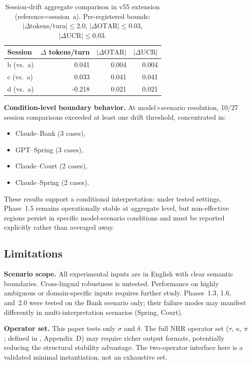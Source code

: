 \documentclass[11pt,a4paper]{article}
\begin{document}
\begin{table}[ht]
\centering
\begin{tabular}{lrrr}
\toprule
\textbf{Session} & $\Delta$ tokens/turn & $|\Delta\text{OTAR}|$ & $|\Delta\text{UCR}|$ \\
\midrule
b (vs.\ a) & 0.041 & 0.004 & 0.004 \\
c (vs.\ a) & 0.033 & 0.041 & 0.041 \\
d (vs.\ a) & -0.218 & 0.021 & 0.021 \\
\bottomrule
\end{tabular}
\caption{Session-drift aggregate comparison in v55 extension (reference=session~a).
Pre-registered bounds: $|\Delta\text{tokens/turn}| \le 2.0$, $|\Delta\text{OTAR}| \le 0.03$, $|\Delta\text{UCR}| \le 0.03$.}
\label{tab:v55_session_drift}
\end{table}

\textbf{Condition-level boundary behavior.}
At model$\times$scenario resolution, 10/27 session comparisons exceeded at least
one drift threshold, concentrated in:
\begin{itemize}
    \item Claude--Bank (3 cases),
    \item GPT--Spring (3 cases),
    \item Claude--Court (2 cases),
    \item Claude--Spring (2 cases).
\end{itemize}

These results support a conditional interpretation: under tested settings,
Phase~1.5 remains operationally stable at aggregate level, but non-effective
regions persist in specific model-scenario conditions and must be reported
explicitly rather than averaged away.

\subsection{Limitations}

\textbf{Scenario scope.} All experimental inputs are in English with clear semantic
boundaries. Cross-lingual robustness is untested. Performance on highly
ambiguous or domain-specific inputs requires further study.
Phases~1.3, 1.6, and~2.0 were tested on the Bank scenario only; their failure
modes may manifest differently in multi-interpretation scenarios (Spring, Court).

\textbf{Operator set.} This paper tests only $\sigma$ and $\delta$. The full
NRR operator set ($\tau$, $\kappa$, $\pi$; defined in \cite{saito2026phi}, Appendix~D) may require richer output formats,
potentially reducing the structural stability advantage.
The two-operator interface here is a validated minimal instantiation, not an exhaustive set.
\end{document}
